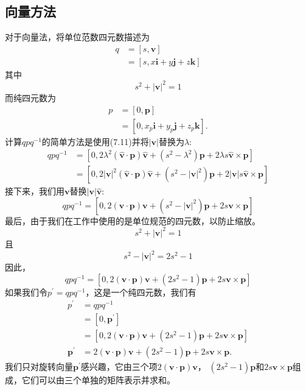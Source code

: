 \subsection{向量方法}
对于向量法，将单位范数四元数描述为
$$
\begin{aligned}
q & =[s, \mathbf{v}] \\
& =[s, x \mathbf{i}+y \mathbf{j}+z \mathbf{k}]
\end{aligned}
$$
其中
$$
s^{2}+|\mathbf{v}|^{2}=1
$$
而纯四元数为
$$
\begin{aligned}
p & =[0, \mathbf{p}] \\
& =\left[0, x_{p} \mathbf{i}+y_{p} \mathbf{j}+z_{p} \mathbf{k}\right] .
\end{aligned}
$$
计算$q p q^{-1}$的简单方法是使用(7.11)并将$|\mathbf{v}|$替换为$\lambda$:
$$
\begin{aligned}
q p q^{-1} & =\left[0,2 \lambda^{2}(\hat{\mathbf{v}} \cdot \mathbf{p}) \hat{\mathbf{v}}+\left(s^{2}-\lambda^{2}\right) \mathbf{p}+2 \lambda s \hat{\mathbf{v}} \times \mathbf{p}\right] \\
& =\left[0,2|\mathbf{v}|^{2}(\hat{\mathbf{v}} \cdot \mathbf{p}) \hat{\mathbf{v}}+\left(s^{2}-|\mathbf{v}|^{2}\right) \mathbf{p}+2|\mathbf{v}| s \hat{\mathbf{v}} \times \mathbf{p}\right]
\end{aligned}
$$
接下来，我们用$\mathbf{v}$替换$|\mathbf{v}| \hat{\mathbf{v}}$:
$$
q p q^{-1}=\left[0,2(\mathbf{v} \cdot \mathbf{p}) \mathbf{v}+\left(s^{2}-|\mathbf{v}|^{2}\right) \mathbf{p}+2 s \mathbf{v} \times \mathbf{p}\right]
$$
最后，由于我们在工作中使用的是单位规范的四元数，以防止缩放。
$$
s^{2}+|\mathbf{v}|^{2}=1
$$
且
$$
s^{2}-|\mathbf{v}|^{2}=2 s^{2}-1
$$
因此，
$$
q p q^{-1}=\left[0,2(\mathbf{v} \cdot \mathbf{p}) \mathbf{v}+\left(2 s^{2}-1\right) \mathbf{p}+2 s \mathbf{v} \times \mathbf{p}\right]
$$
如果我们令$p^{\prime}=q p q^{-1}$，这是一个纯四元数，我们有
$$
\begin{aligned}
p^{\prime} & =q p q^{-1} \\
& =\left[0, \mathbf{p}^{\prime}\right] \\
& =\left[0,2(\mathbf{v} \cdot \mathbf{p}) \mathbf{v}+\left(2 s^{2}-1\right) \mathbf{p}+2 s \mathbf{v} \times \mathbf{p}\right] \\
\mathbf{p}^{\prime} & =2(\mathbf{v} \cdot \mathbf{p}) \mathbf{v}+\left(2 s^{2}-1\right) \mathbf{p}+2 s \mathbf{v} \times \mathbf{p} .
\end{aligned}
$$
我们只对旋转向量$\mathbf{p}^{\prime}$感兴趣，它由三个项$2(\mathbf{v} \cdot \mathbf{p}) \mathbf{v}$， $\left(2s ^{2}-1\right) \mathbf{p}$和$ 2s \mathbf{v} \times \mathbf{p}$组成，它们可以由三个单独的矩阵表示并求和。
